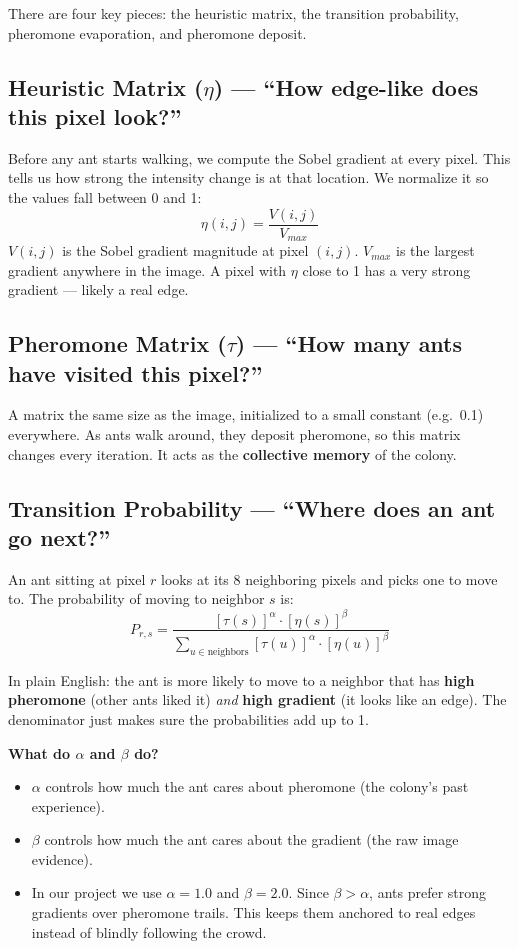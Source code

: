 \documentclass[12pt,a4paper]{article}
\begin{document}
There are four key pieces: the heuristic matrix, the transition probability, pheromone evaporation, and pheromone deposit.

\subsection{Heuristic Matrix ($\eta$) --- ``How edge-like does this pixel look?''}
Before any ant starts walking, we compute the Sobel gradient at every pixel. This tells us how strong the intensity change is at that location. We normalize it so the values fall between 0 and 1:
\begin{equation}
    \eta(i,j) = \frac{V(i,j)}{V_{max}}
\end{equation}
$V(i,j)$ is the Sobel gradient magnitude at pixel $(i,j)$. $V_{max}$ is the largest gradient anywhere in the image. A pixel with $\eta$ close to 1 has a very strong gradient --- likely a real edge.

\subsection{Pheromone Matrix ($\tau$) --- ``How many ants have visited this pixel?''}
A matrix the same size as the image, initialized to a small constant (e.g.\ 0.1) everywhere. As ants walk around, they deposit pheromone, so this matrix changes every iteration. It acts as the \textbf{collective memory} of the colony.

\subsection{Transition Probability --- ``Where does an ant go next?''}
An ant sitting at pixel $r$ looks at its 8 neighboring pixels and picks one to move to. The probability of moving to neighbor $s$ is:
\begin{equation}
    P_{r,s} = \frac{[\tau(s)]^\alpha \cdot [\eta(s)]^\beta}{\sum_{u \in \text{neighbors}} [\tau(u)]^\alpha \cdot [\eta(u)]^\beta}
\end{equation}

In plain English: the ant is more likely to move to a neighbor that has \textbf{high pheromone} (other ants liked it) \textit{and} \textbf{high gradient} (it looks like an edge). The denominator just makes sure the probabilities add up to 1.

\textbf{What do $\alpha$ and $\beta$ do?}
\begin{itemize}
    \item $\alpha$ controls how much the ant cares about pheromone (the colony's past experience).
    \item $\beta$ controls how much the ant cares about the gradient (the raw image evidence).
    \item In our project we use $\alpha = 1.0$ and $\beta = 2.0$. Since $\beta > \alpha$, ants prefer strong gradients over pheromone trails. This keeps them anchored to real edges instead of blindly following the crowd.
\end{itemize}
\end{document}
